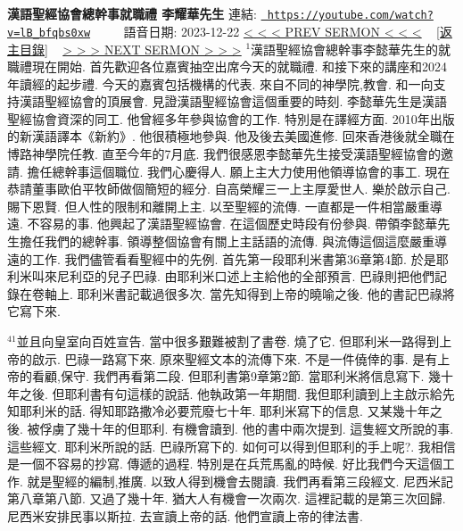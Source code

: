 \documentclass{book}
\begin{document}
\section{}
\label{sec:lB_bfqbs0xw}
\textbf{漢語聖經協會總幹事就職禮 李耀華先生}
\newline
\newline
連結: \href{https://youtube.com/watch?v=lB_bfqbs0xw}{\texttt{ https://youtube.com/watch?v=lB\_bfqbs0xw}} ~~~~ 語音日期: 2023-12-22 
\newline
\newline
\hyperref[sec:h6V3lBcFI1I]{\small{< < < PREV SERMON < < <}}
~
\hyperref[sec:index]{\small{[返主目錄]}}
~
\hyperref[sec:code]{\small{> > > NEXT SERMON > > >}}
\newline
\newline
$^{1}$漢語聖經協會總幹事李懿華先生的就職禮現在開始.
首先歡迎各位嘉賓抽空出席今天的就職禮.
和接下來的講座和2024年讀經的起步禮.
今天的嘉賓包括機構的代表.
來自不同的神學院,教會.
和一向支持漢語聖經協會的頂展會.
見證漢語聖經協會這個重要的時刻.
李懿華先生是漢語聖經協會資深的同工.
他曾經多年參與協會的工作.
特別是在譯經方面.
2010年出版的新漢語譯本《新約》.
他很積極地參與.
他及後去美國進修.
回來香港後就全職在博路神學院任教.
直至今年的7月底.
我們很感恩李懿華先生接受漢語聖經協會的邀請.
擔任總幹事這個職位.
我們心慶得人.
願上主大力使用他領導協會的事工.
現在恭請董事歐伯平牧師做個簡短的經分.
自高榮耀三一上主厚愛世人.
樂於啟示自己.
賜下恩賢.
但人性的限制和離開上主.
以至聖經的流傳.
一直都是一件相當嚴重導遠.
不容易的事.
他興起了漢語聖經協會.
在這個歷史時段有份參與.
帶領李懿華先生擔任我們的總幹事.
領導整個協會有關上主話語的流傳.
與流傳這個這麼嚴重導遠的工作.
我們儘管看看聖經中的先例.
首先第一段耶利米書第36章第4節.
於是耶利米叫來尼利亞的兒子巴祿.
由耶利米口述上主給他的全部預言.
巴祿則把他們記錄在卷軸上.
耶利米書記載過很多次.
當先知得到上帝的曉喻之後.
他的書記巴祿將它寫下來.

$^{41}$並且向皇室向百姓宣告.
當中很多艱難被割了書卷.
燒了它.
但耶利米一路得到上帝的啟示.
巴祿一路寫下來.
原來聖經文本的流傳下來.
不是一件僥倖的事.
是有上帝的看顧,保守.
我們再看第二段.
但耶利書第9章第2節.
當耶利米將信息寫下.
幾十年之後.
但耶利書有句這樣的說話.
他執政第一年期間.
我但耶利讀到上主啟示給先知耶利米的話.
得知耶路撒冷必要荒廢七十年.
耶利米寫下的信息.
又某幾十年之後.
被俘虜了幾十年的但耶利.
有機會讀到.
他的書中兩次提到.
這隻經文所說的事.
這些經文.
耶利米所說的話.
巴祿所寫下的.
如何可以得到但耶利的手上呢?.
我相信是一個不容易的抄寫.
傳遞的過程.
特別是在兵荒馬亂的時候.
好比我們今天這個工作.
就是聖經的編制,推廣.
以致人得到機會去閱讀.
我們再看第三段經文.
尼西米記第八章第八節.
又過了幾十年.
猶大人有機會一次兩次.
這裡記載的是第三次回歸.
尼西米安排民事以斯拉.
去宣讀上帝的話.
他們宣讀上帝的律法書.
\end{document}
